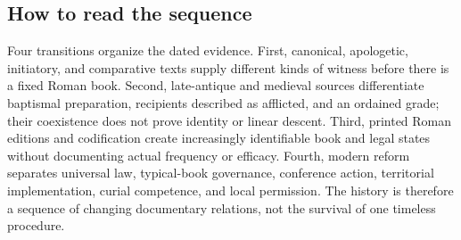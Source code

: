 \subsection{How to read the sequence}

Four transitions organize the dated evidence. First, canonical, apologetic,
initiatory, and comparative texts supply different kinds of witness before
there is a fixed Roman book. Second, late-antique and medieval sources
differentiate baptismal preparation, recipients described as afflicted, and
an ordained grade; their coexistence does not prove identity or linear
descent. Third, printed Roman editions and codification create increasingly
identifiable book and legal states without documenting actual frequency or
efficacy. Fourth, modern reform separates universal law, typical-book
governance, conference action, territorial implementation, curial competence,
and local permission. The history is therefore a sequence of changing
documentary relations, not the survival of one timeless procedure.
